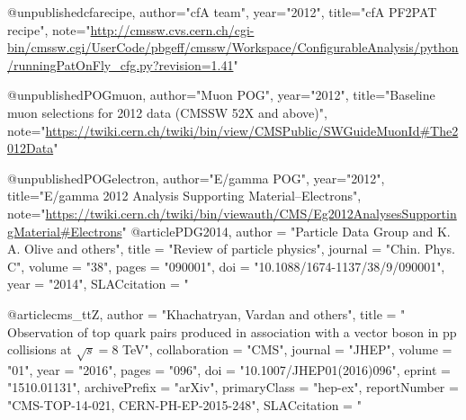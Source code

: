 @unpublished{cfarecipe,
author="{cfA team}",
year="2012",
title="cfA PF2PAT recipe",
note="\url{http://cmssw.cvs.cern.ch/cgi-bin/cmssw.cgi/UserCode/pbgeff/cmssw/Workspace/ConfigurableAnalysis/python/runningPatOnFly_cfg.py?revision=1.41}"
}


@unpublished{POGmuon,
author="{Muon POG}",
year="2012",
title="Baseline muon selections for 2012 data (CMSSW 52X and above)",
note="\url{https://twiki.cern.ch/twiki/bin/view/CMSPublic/SWGuideMuonId#The2012Data}"
}

@unpublished{POGelectron,
author="{E/gamma POG}",
year="2012",
title="E/gamma 2012 Analysis Supporting Material--Electrons",
note="\url{https://twiki.cern.ch/twiki/bin/viewauth/CMS/Eg2012AnalysesSupportingMaterial#Electrons}"
}
@article{PDG2014,
      author         = "{Particle Data Group} and K. A. Olive and others",
      title          = "{Review of particle physics}",
      journal        = "Chin. Phys. C",
      volume         = "38",
      pages          = "090001",
      doi            = "10.1088/1674-1137/38/9/090001",
      year           = "2014",
      SLACcitation   = "%
}

@article{cms_ttZ,
      author         = "Khachatryan, Vardan and others",
      title          = "{ 	
Observation of top quark pairs produced in association with a vector boson in pp collisions at $\sqrt{s}= 8$ TeV}",
      collaboration  = "CMS",
      journal        = "JHEP",
      volume         = "01",
      year           = "2016",
      pages          = "096",
      doi            = "10.1007/JHEP01(2016)096",
      eprint         = "1510.01131",
      archivePrefix  = "arXiv",
      primaryClass   = "hep-ex",
      reportNumber   = "CMS-TOP-14-021, CERN-PH-EP-2015-248",
      SLACcitation   = "%
}
